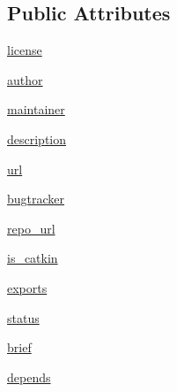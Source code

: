 \subsection*{Public Attributes}
\begin{DoxyCompactItemize}
\item 
\hyperlink{classrosdoc__lite_1_1rdcore_1_1PackageInformation_a64ff5843063bf71f16f4cdab4d1bbd18}{license}
\item 
\hyperlink{classrosdoc__lite_1_1rdcore_1_1PackageInformation_a5c27cda0ae2ab8203fb74d3d5e8d0ed2}{author}
\item 
\hyperlink{classrosdoc__lite_1_1rdcore_1_1PackageInformation_a1972daa7cde3c680c98bb054eda418a5}{maintainer}
\item 
\hyperlink{classrosdoc__lite_1_1rdcore_1_1PackageInformation_a579d2604f2cfac815e8e3072c0833360}{description}
\item 
\hyperlink{classrosdoc__lite_1_1rdcore_1_1PackageInformation_a0ef2dba844b386398740004bc74d1bce}{url}
\item 
\hyperlink{classrosdoc__lite_1_1rdcore_1_1PackageInformation_a587611359b64f8680f3dc88110406e38}{bugtracker}
\item 
\hyperlink{classrosdoc__lite_1_1rdcore_1_1PackageInformation_a5a276ff51a0190a30dc47b1f68573718}{repo\+\_\+url}
\item 
\hyperlink{classrosdoc__lite_1_1rdcore_1_1PackageInformation_a62a03a706ae759bc4e44fce551846df8}{is\+\_\+catkin}
\item 
\hyperlink{classrosdoc__lite_1_1rdcore_1_1PackageInformation_aa8aedabc1d5a9d4876b1a52560784272}{exports}
\item 
\hyperlink{classrosdoc__lite_1_1rdcore_1_1PackageInformation_a0e5a0d40d1d31760edff0121a6ce2c7f}{status}
\item 
\hyperlink{classrosdoc__lite_1_1rdcore_1_1PackageInformation_aea176e3d7ce96d59c465aa7ea95cba0f}{brief}
\item 
\hyperlink{classrosdoc__lite_1_1rdcore_1_1PackageInformation_a6ba9c49b465bee65c40b4561b7f58ee5}{depends}
\end{DoxyCompactItemize}
